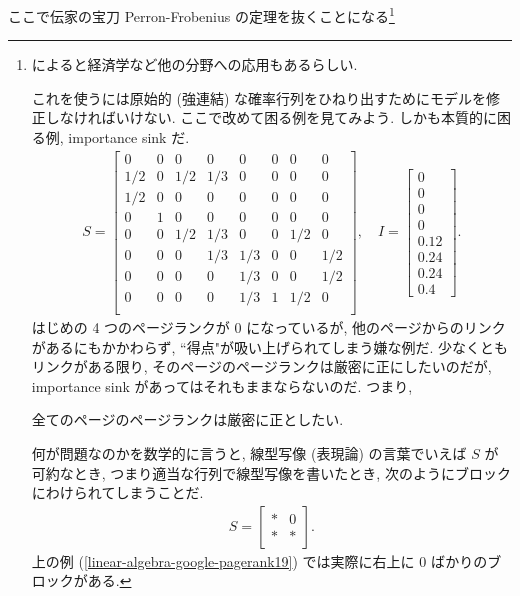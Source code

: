 \documentclass[openany, a4paper, oneside]{jsbook}
\begin{document}
ここで伝家の宝刀 Perron-Frobenius の定理を抜くことになる\footnote{\cite{MasahikoSaitoh1} によると経済学など他の分野への応用もあるらしい.

これを使うには原始的 (強連結) な確率行列をひねり出すためにモデルを修正しなければいけない.
ここで改めて困る例を見てみよう.
しかも本質的に困る例, importance sink だ.
\begin{align}
 S
 =
 \begin{bmatrix}
  0    &    0    &    0    &    0    &    0    &    0    &    0    &    0\\
  1/2    &    0    &    1/2    &    1/3    &    0    &    0    &    0    &    0\\
  1/2    &    0    &    0    &    0    &    0    &    0    &    0    &    0\\
  0    &    1    &    0    &    0    &    0    &    0    &    0    &    0\\
  0    &    0    &    1/2    &    1/3    &    0    &    0    &    1/2    &    0\\
  0    &    0    &    0    &    1/3    &    1/3    &    0    &    0    &    1/2\\
  0    &    0    &    0    &    0    &    1/3    &    0    &    0    &    1/2\\
  0    &    0    &    0    &    0    &    1/3    &    1    &    1/2    &    0\\
 \end{bmatrix}
 , \quad
 I
 =
 \begin{bmatrix}
  0\\
  0\\
  0\\
  0\\
  0.12\\
  0.24\\
  0.24\\
  0.4
 \end{bmatrix}. \label{linear-algebra-google-pagerank19}
\end{align}
はじめの 4 つのページランクが 0 になっているが,
他のページからのリンクがあるにもかかわらず, ``得点"が吸い上げられてしまう嫌な例だ.
少なくともリンクがある限り, そのページのページランクは厳密に正にしたいのだが,
importance sink があってはそれもままならないのだ.
つまり,
\begin{req}
全てのページのページランクは厳密に正としたい.
\end{req}

何が問題なのかを数学的に言うと, 線型写像 (表現論) の言葉でいえば
$S$ が可約なとき,
つまり適当な行列で線型写像を書いたとき, 次のようにブロックにわけられてしまうことだ.
\begin{align}
 S
 =
 \begin{bmatrix}
  \ast    &    0 \\
  \ast    &    \ast
 \end{bmatrix}.
\end{align}
上の例 (\ref{linear-algebra-google-pagerank19}) では実際に右上に 0 ばかりのブロックがある.

}
\end{document}

